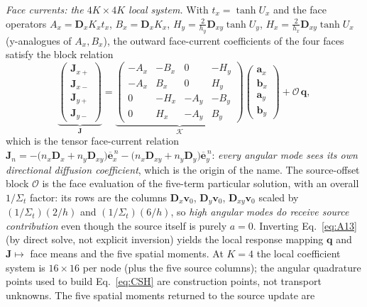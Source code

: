 \documentclass[11pt,a4paper]{article}
\begin{document}
\emph{Face currents: the $4K\times4K$ local system.}\label{sec:face}
With $t_x=\tanh U_x$ and the face operators $A_x=\mathbf{D}_xK_xt_x$,
$B_x=\mathbf{D}_xK_x$, $H_y=\frac{2}{h_y}\mathbf{D}_{xy}\tanh U_y$,
$H_x=\frac{2}{h_x}\mathbf{D}_{xy}\tanh U_x$ (y-analogues of $A_x,B_x$),
the outward face-current coefficients of the four faces satisfy the
block relation
\begin{equation}
\underbrace{\begin{pmatrix}\mathbf{J}_{x+}\\\mathbf{J}_{x-}\\
\mathbf{J}_{y+}\\\mathbf{J}_{y-}\end{pmatrix}}_{\mathbf{J}}
= \underbrace{\begin{pmatrix}
-A_x&-B_x&0&-H_y\\
-A_x& B_x&0& H_y\\
0&-H_x&-A_y&-B_y\\
0& H_x&-A_y& B_y
\end{pmatrix}}_{\mathcal{K}}
\begin{pmatrix}\mathbf{a}_x\\\mathbf{b}_x\\\mathbf{a}_y\\\mathbf{b}_y\end{pmatrix}
+ \mathcal{O}\,\mathbf{q},
\label{eq:A13}
\end{equation}
which is the tensor face-current relation
$\mathbf{J}_n = -\big(n_x\mathbf{D}_x+n_y\mathbf{D}_{xy}\big)\overline{\mathbf{e}}_x^{\,n}
-\big(n_x\mathbf{D}_{xy}+n_y\mathbf{D}_y\big)\overline{\mathbf{e}}_y^{\,n}$:
\emph{every angular mode sees its own directional diffusion
coefficient}, which is the origin of the name. The source-offset block
$\mathcal{O}$ is the face evaluation of the five-term particular
solution, with an overall $1/\Sigma_t$ factor: its rows are the
columns $\mathbf{D}_x\mathbf{v}_0$, $\mathbf{D}_y\mathbf{v}_0$,
$\mathbf{D}_{xy}\mathbf{v}_0$ scaled by $(1/\Sigma_t)(2/h)$ and
$(1/\Sigma_t)(6/h)$, so \emph{high angular modes do receive source
contribution} even though the source itself is purely $a{=}0$.
Inverting Eq.~\eqref{eq:A13} (by direct solve, not explicit
inversion) yields the local response mapping
$\mathbf{q}$ and $\mathbf{J}\mapsto$ face means and the five spatial
moments. At $K{=}4$ the local coefficient system is $16\times16$ per
node (plus the five source columns); the angular quadrature points used
to build Eq.~\eqref{eq:CSH} are construction points, not transport
unknowns. The five spatial moments returned to the source update are
\end{document}

